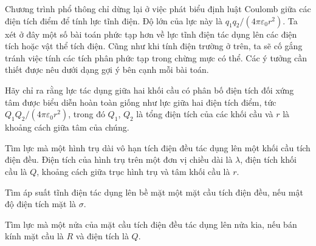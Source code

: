 
Chương trình phổ thông chỉ dừng lại ở việc phát biểu định luật Coulomb giữa các điện tích điểm để tính lực tĩnh điện. Độ lớn của lực này là $q_1q_2/(4\pi\varepsilon_0 r^2)$. Ta xét ở đây một số bài toán phức tạp hơn về lực tĩnh điện tác dụng lên các điện tích hoặc vật thể tích điện. Cũng như khi tính điện trường ở trên, ta sẽ cố gắng tránh việc tính các tích phân phức tạp trong chừng mực có thể. Các ý tưởng cần thiết được nêu dưới dạng gợi ý bên cạnh mỗi bài toán.

 Hãy chỉ ra rằng lực tác dụng giữa hai khối cầu có phân bố điện tích đối xứng tâm được biểu diễn hoàn toàn giống như lực giữa hai điện tích điểm, tức $Q_1Q_2/(4\pi\varepsilon_0 r^2)$, trong đó $Q_1$, $Q_2$ là tổng điện tích của các khối cầu và $r$ là khoảng cách giữa tâm của chúng. 

 Tìm lực mà một hình trụ dài vô hạn tích điện đều tác dụng lên một khối cầu tích điện đều. Điện tích của hình trụ trên một đơn vị chiều dài là $\lambda$, điện tích khối cầu là $Q$, khoảng cách giữa trục hình trụ và tâm khối cầu là $r$.


 Tìm áp suất tĩnh điện tác dụng lên bề mặt một mặt cầu tích điện đều, nếu mật độ điện tích mặt là $\sigma$. 


 Tìm lực mà một nửa của mặt cầu tích điện đều tác dụng lên nửa kia, nếu bán kính mặt cầu là $R$ và điện tích là $Q$. 


